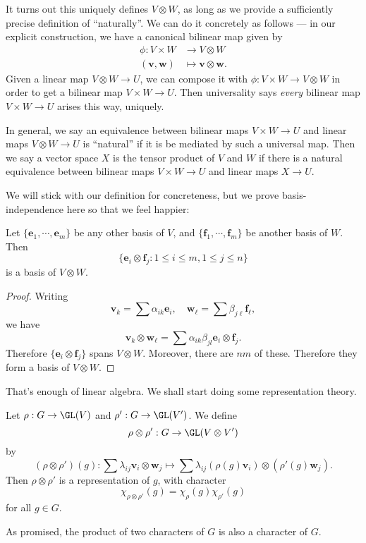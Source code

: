 \documentclass[a4paper]{article}
\begin{document}
It turns out this uniquely defines $V \otimes W$, as long as we provide a sufficiently precise definition of ``naturally''. We can do it concretely as follows --- in our explicit construction, we have a canonical bilinear map given by
\begin{align*}
  \phi: V\times W &\to V \otimes W\\
  (\mathbf{v}, \mathbf{w}) &\mapsto \mathbf{v}\otimes \mathbf{w}.
\end{align*}
Given a linear map $V \otimes W \to U$, we can compose it with $\phi: V \times W \to V \otimes W$ in order to get a bilinear map $V \times W \to U$. Then universality says \emph{every} bilinear map $V \times W \to U$ arises this way, uniquely.

In general, we say an equivalence between bilinear maps $V \times W \to U$ and linear maps $V \otimes W \to U$ is ``natural'' if it is be mediated by such a universal map. Then we say a vector space $X$ is the tensor product of $V$ and $W$ if there is a natural equivalence between bilinear maps $V \times W \to U$ and linear maps $X \to U$.

We will stick with our definition for concreteness, but we prove basis-independence here so that we feel happier:
\begin{lemma}
  Let $\{\mathbf{e}_1, \cdots, \mathbf{e}_m\}$ be any other basis of $V$, and $\{\mathbf{f}_1, \cdots, \mathbf{f}_m\}$ be another basis of $W$. Then
  \[
    \{\mathbf{e}_i \otimes \mathbf{f}_j: 1 \leq i \leq m, 1 \leq j \leq n\}
  \]
  is a basis of $V\otimes W$.
\end{lemma}

\begin{proof}
  Writing
  \[
    \mathbf{v}_k = \sum \alpha_{ik} \mathbf{e}_i,\quad \mathbf{w}_\ell = \sum \beta_{j\ell} \mathbf{f}_\ell,
  \]
  we have
  \[
    \mathbf{v}_k \otimes \mathbf{w}_\ell = \sum \alpha_{ik} \beta_{jl} \mathbf{e}_i \otimes \mathbf{f}_j.
  \]
  Therefore $\{\mathbf{e}_i \otimes \mathbf{f}_j\}$ spans $V \otimes W$. Moreover, there are $nm$ of these. Therefore they form a basis of $V\otimes W$.
\end{proof}

That's enough of linear algebra. We shall start doing some representation theory.
\begin{prop}
  Let $\rho: G \to \GL(V)$ and $\rho': G \to \GL(V')$. We define
  \[
    \rho \otimes \rho': G \to \GL(V\otimes V')
  \]
  by
  \[
    (\rho \otimes \rho')(g) : \sum \lambda_{ij} \mathbf{v}_i \otimes \mathbf{w}_j \mapsto \sum \lambda_{ij} (\rho(g)\mathbf{v}_i)\otimes (\rho'(g) \mathbf{w}_j).
  \]
  Then $\rho \otimes \rho'$ is a representation of $g$, with character
  \[
    \chi_{\rho\otimes \rho'}(g) = \chi_\rho(g) \chi_{\rho'}(g)
  \]
  for all $g \in G$.
\end{prop}
As promised, the product of two characters of $G$ is also a character of $G$.
\end{document}
